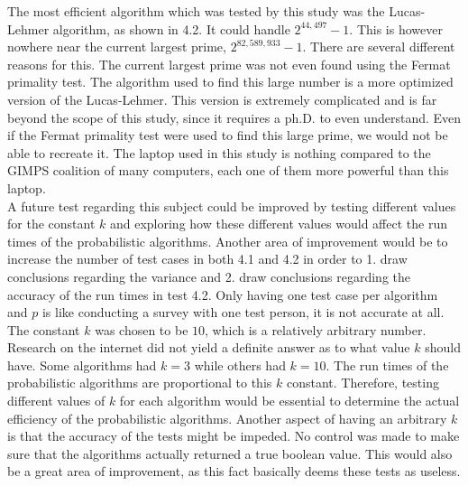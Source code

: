 \documentclass[main.tex]{subfiles}
\begin{document}
The most efficient algorithm which was tested by this study was the Lucas-Lehmer
algorithm, as shown in 4.2. It could handle $2^{44,497}-1$. This is however
nowhere near the current largest prime, $2^{82,589,933}-1$. There are several
different reasons for this. The current largest prime was not even found using
the Fermat primality test. The algorithm used to find this large number is
a more optimized version of the Lucas-Lehmer. This version is extremely complicated and is far beyond the scope of this study, since it
requires a ph.D. to even understand. Even if the Fermat primality test were used
to find this large prime, we would not be able to recreate it. The laptop used
in this study is nothing compared to the GIMPS coalition of many computers, each
one of them more powerful than this laptop. \\

A future test regarding this subject could be improved by testing different
values for the constant $k$ and exploring how these different values would
affect the run times of the probabilistic algorithms. Another area of
improvement would be to increase the number of test cases in both 4.1 and 4.2 in
order to 1. draw conclusions regarding the variance and 2. draw conclusions
regarding the accuracy of the run times in test 4.2. Only having one test case
per algorithm and $p$ is like conducting a survey with one test person, it is
not accurate at all. \\

The constant $k$ was chosen to be $10$, which is a relatively arbitrary number.
Research on the internet did not yield a definite answer as to what value $k$
should have. Some algorithms had $k = 3$ while others had $k = 10$. The run
times of the probabilistic algorithms are proportional to this $k$ constant. Therefore,
testing different values of $k$ for each algorithm would be essential to
determine the actual efficiency of the probabilistic algorithms. Another aspect
of having an arbitrary $k$ is that the accuracy of the tests might be impeded.
No control was made to make sure that the algorithms actually returned a true
boolean value. This would also be a great area of improvement, as this fact
basically deems these tests as useless. \\ 
\end{document}
